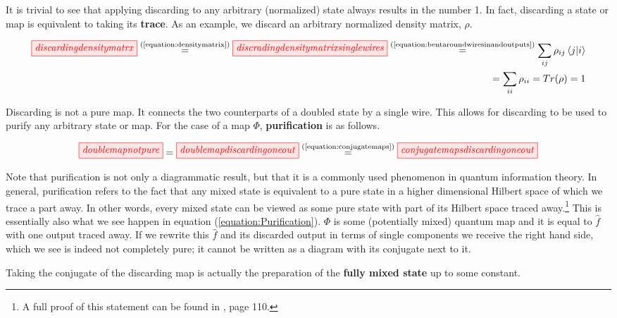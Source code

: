 \documentclass[]{article}
\newcommand{\equaltext}[1]{\ensuremath{\stackrel{\text{#1}}{=}}}
\begin{document}
It is trivial to see that applying discarding to any arbitrary (normalized) state always results in the number 1. In fact, discarding a state or map is equivalent to taking its \textbf{trace}. As an example, we discard an arbitrary normalized density matrix, $\rho$.

\begin{equation}
\label{equation:discardingstate}
\begin{split}
\tikzfig{discardingdensitymatrx} \equaltext{(\ref{equation:densitymatrix})} \tikzfig{discradingdensitymatrixsinglewires} \equaltext{(\ref{equation:bentaroundwiresinandoutputs})} \sum\limits_{ij} \rho_{ij} \bra{j}\ket{i} \\ = \sum\limits_{ii} \rho_{ii} = Tr(\rho) = 1
\end{split}
\end{equation}

Discarding is not a pure map. It connects the two counterparts of a doubled state by a single wire. This allows for discarding to be used to purify any arbitrary state or map. For the case of a map $\Phi$, \textbf{purification} is as follows.

\begin{equation}
\label{equation:Purification}
\tikzfig{doublemapnotpure} = \tikzfig{doublemapdiscardingoneout} \equaltext{(\ref{equation:conjugatemaps})} \tikzfig{conjugatemapsdiscardingoneout}
\end{equation}

Note that purification is not only a diagrammatic result, but that it is a commonly used phenomenon in quantum information theory. In general, purification refers to the fact that any mixed state is equivalent to a pure state in a higher dimensional Hilbert space of which we trace a part away. In other words, every mixed state can be viewed as some pure state with part of its Hilbert space traced away.\footnote{ A full proof of this statement can be found in \cite{Nielsen2011}, page 110.} This is essentially also what we see happen in equation (\ref{equation:Purification}). $\Phi$ is some (potentially mixed) quantum map and it is equal to $\hat{f}$ with one output traced away. If we rewrite this $\hat{f}$ and its discarded output in terms of single components we receive the right hand side, which we see is indeed not completely pure; it cannot be written as a diagram with its conjugate next to it.

Taking the conjugate of the discarding map is actually the preparation of the \textbf{fully mixed state} up to some constant.
\end{document}
